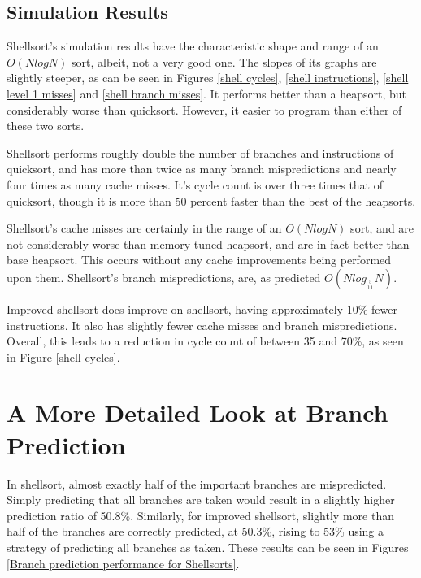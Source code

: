 \subsection{Simulation Results}

Shellsort's simulation results have the characteristic shape and range of an
$O(NlogN)$ sort, albeit, not a very good one. The slopes of its graphs are
slightly steeper, as can be seen in Figures \ref{shell cycles}, \ref{shell
instructions}, \ref{shell level 1 misses} and \ref{shell branch misses}. It
performs better than a heapsort, but considerably worse than quicksort. However,
it easier to program than either of these two sorts.

Shellsort performs roughly double the number of branches and instructions of
quicksort, and has more than twice as many branch mispredictions and nearly
four times as many cache misses. It's cycle count is over three times that of
quicksort, though it is more than 50 percent faster than the best of the
heapsorts.

Shellsort's cache misses are certainly in the range of an $O(NlogN)$ sort, and
are not considerably worse than memory-tuned heapsort, and are in fact better
than base heapsort. This occurs without any cache improvements being performed
upon them.  Shellsort's branch mispredictions, are, as predicted
$O(Nlog_{\frac{5}{11}}N)$. 

Improved shellsort does improve on shellsort, having approximately 10\% fewer
instructions. It also has slightly fewer cache misses and branch mispredictions.
Overall, this leads to a reduction in cycle count of between 35 and 70\%, as
seen in Figure \ref{shell cycles}.

\section{A More Detailed Look at Branch Prediction}


In shellsort, almost exactly half of the important branches are mispredicted.
Simply predicting that all branches are taken would result in a slightly higher
prediction ratio of 50.8\%. Similarly, for improved shellsort, slightly more
than half of the branches are correctly predicted, at 50.3\%, rising to 53\%
using a strategy of predicting all branches as taken. These results can be seen
in Figures \ref{Branch prediction performance for Shellsorts}.

